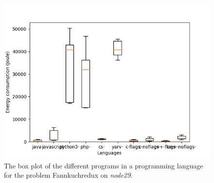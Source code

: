 \begin{appendices}
\begin{table}[h]
\centering
{}
\caption{The comparison of the different languages for the Binarytrees problem on \textit{node29}. A \textit{+} means that the language on the row has a lower energy consumption then the language on the column, the opposite for \textit{-}.}
\label{tab:lang-binarytrees2}
\end{table}

\begin{figure}[h]
    \centering
    \includegraphics[width=.6\textwidth]{graphs/fannkuchredux_BOXoverview2.png}
    \caption{The box plot of the different programs in a programming language for the problem Fannkuchredux on \textit{node29}.}
    \label{fig:box-fannkuchredux2}
\end{figure}


\end{appendices}
